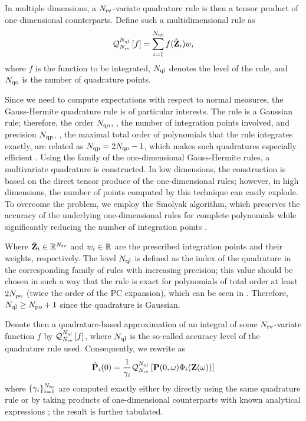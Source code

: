 In multiple dimensions, a ${N_\text{rv}}$-variate quadrature rule is then a tensor product of one-dimensional counterparts. Define such a multidimensional rule as
\[
  \mathcal{Q}_{{N_\text{rv}}}^{N_\text{ql}}\left[f\right] = \sum_{i = 1}^{N_\text{qo}} f(\hat{\mathbf{Z}}_i) w_i
\]
 where $f$ is the function to be integrated, $N_\text{ql}$ denotes the level of the rule, and $N_\text{qo}$ is the number of quadrature points.

Since we need to compute expectations with respect to normal measures, the Gauss-Hermite quadrature rule is of particular interests. The rule is a Gaussian rule; therefore, the order $N_\text{qo}$, \ie, the number of integration points involved, and precision $N_\text{qp}$, \ie, the maximal total order of polynomials that the rule integrates exactly, are related as $N_\text{qp} = 2 N_\text{qo} - 1$, which makes such quadratures especially efficient \cite{heiss2008}. Using the family of the one-dimensional Gauss-Hermite rules, a multivariate quadrature is constructed. In low dimensions, the construction is based on the direct tensor produce of the one-dimensional rules; however, in high dimensions, the number of points computed by this technique can easily explode. To overcome the problem, we employ the Smolyak algorithm, which preserves the accuracy of the underlying one-dimensional rules for complete polynomials while significantly reducing the number of integration points \cite{eldred2009, maitre2010, heiss2008}.

Where $\hat{\mathbf{Z}}_i \in \mathbb{R}^{N_\text{rv}}$ and $w_i \in \mathbb{R}$ are the prescribed integration points and their weights, respectively. The level $N_\text{ql}$ is defined as the index of the quadrature in the corresponding family of rules with increasing precision; this value should be chosen in such a way that the rule is exact for polynomials of total order at least $2 {N_\text{po}}$ (twice the order of the PC expansion), which can be seen in  \cite{eldred2009}. Therefore, $N_\text{ql} \geq {N_\text{po}} + 1$ since the quadrature is Gaussian.

Denote then a quadrature-based approximation of an integral of some ${N_\text{rv}}$-variate function $f$ by $\mathcal{Q}_{{N_\text{rv}}}^{N_\text{ql}}\left[f\right]$, where $N_\text{ql}$ is the so-called accuracy level of the quadrature rule used. Consequently, we rewrite  as
\[
  \hat{\mathbf{P}}_i(0) = \frac{1}{\gamma_i} \mathcal{Q}_{{N_\text{rv}}}^{N_\text{ql}}\left[\mathbf{P}(0, \omega) \Phi_i(\mathbf{Z}(\omega))\right]
\]
where $\{ \gamma_i \}_{i = 1}^{{N_\text{bs}}}$ are computed exactly either by directly using the same quadrature rule or by taking products of one-dimensional counterparts with known analytical expressions \cite{xiu2010}; the result is further tabulated.
